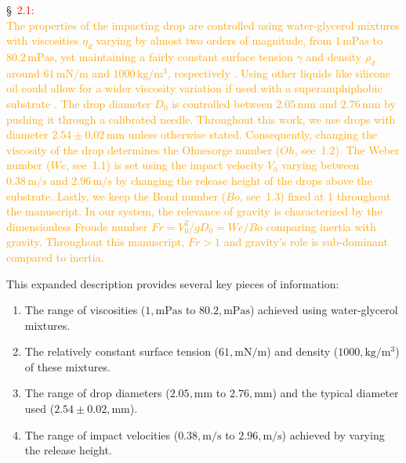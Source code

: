 \documentclass[]{article}
\newcommand*\red{\textcolor{red}}
\newcommand{\VS}[1]{{\textcolor{orange}{#1}}}
\begin{document}
\begin{enumerate}
	\S~\red{2.1:}\\
	\VS{The properties of the impacting drop are controlled using water-glycerol mixtures with viscosities $\eta_d$ varying by almost two orders of magnitude, from $1\,\si{\milli\pascal}\si{\second}$ to $80.2\,\si{\milli\pascal}\si{\second}$, yet maintaining a fairly constant surface tension $\gamma$ and density $\rho_d$ around $61\,\si{\milli\newton}/\si{\meter}$ and $1000\,\si{\kilo\gram}/\si{\cubic\meter}$, respectively \citep{cheng2008formula, volk2018density, Jha2020}. Using other liquids like silicone oil could allow for a wider viscosity variation if used with a superamphiphobic substrate \citep{deng2012candle}. The drop diameter $D_0$ is controlled between $2.05\,\si{\milli\meter}$ and $2.76\,\si{\milli\meter}$ by pushing it through a calibrated needle. Throughout this work, we use drops with diameter $2.54 \pm 0.02\,\si{\milli\meter}$ unless otherwise stated. Consequently, changing the viscosity of the drop determines the Ohnesorge number ($Oh$, see~1.2). The Weber number ($We$, see~1.1) is set using the impact velocity $V_0$ varying between $0.38\,\si{\meter}/\si{\second}$ and $2.96\,\si{\meter}/\si{\second}$ by changing the release height of the drops above the substrate. Lastly, we keep the Bond number ($Bo$, see~1.3) fixed at 1 throughout the manuscript. In our system, the relevance of gravity is characterized by the dimensionless Froude number $Fr = V_0^2/gD_0 = We/Bo$ comparing inertia with gravity. Throughout this manuscript, $Fr > 1$ and gravity's role is sub-dominant compared to inertia.}
	
	This expanded description provides several key pieces of information:
	\begin{enumerate}
		\item The range of viscosities ($1,\si{\milli\pascal}\si{\second}$ to $80.2,\si{\milli\pascal}\si{\second}$) achieved using water-glycerol mixtures.
		\item The relatively constant surface tension ($61,\si{\milli\newton}/\si{\meter}$) and density ($1000,\si{\kilo\gram}/\si{\cubic\meter}$) of these mixtures.
		\item The range of drop diameters ($2.05,\si{\milli\meter}$ to $2.76,\si{\milli\meter}$) and the typical diameter used ($2.54 \pm 0.02,\si{\milli\meter}$).
		\item The range of impact velocities ($0.38,\si{\meter}/\si{\second}$ to $2.96,\si{\meter}/\si{\second}$) achieved by varying the release height.
	\end{enumerate}


\end{enumerate}
\end{document}
